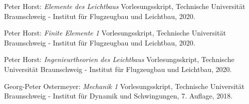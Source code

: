 \begin{thebibliography}{99}
	Peter Horst:
	\textit{Elemente des Leichtbaus}
	Vorlesungsskript, Technische Universität Braunschweig - Institut für Flugzeugbau und Leichtbau, 2020.
	
	Peter Horst:
	\textit{Finite Elemente 1}
	Vorlesungsskript, Technische Universität Braunschweig - Institut für Flugzeugbau und Leichtbau, 2020.
	
	Peter Horst:
	\textit{Ingenieurtheorien des Leichtbaus}
	Vorlesungsskript, Technische Universität Braunschweig - Institut für Flugzeugbau und Leichtbau, 2020.
	
	Georg-Peter Ostermeyer:
	\textit{Mechanik 1}
	Vorlesungsskript, Technische Universität Braunschweig - Institut für Dynamik und Schwingungen, 7. Auflage, 2018.
	
	
\end{thebibliography}